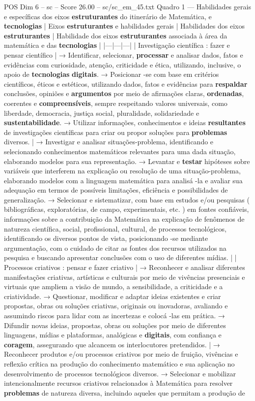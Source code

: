 \begin{textsample}{POS Dim 6 – sc – Score 26.00 – sc/sc\_em\_45.txt}
Quadro 1 — Habilidades gerais e específicas dos eixos \textbf{estruturantes} do itinerário de Matemática, e \textbf{tecnologias} | Eixos \textbf{estruturantes} e habilidades gerais | Habilidades dos eixos \textbf{estruturantes} | Habilidade dos eixos \textbf{estruturantes} associada à área da matemática e das \textbf{tecnologias} | |---|---|---| | Investigação científica : fazer e pensar científico | → Identificar, selecionar, \textbf{processar} e analisar dados, fatos e evidências com curiosidade, atenção, criticidade e ética, utilizando, inclusive, o apoio de \textbf{tecnologias} \textbf{digitais}. → Posicionar -se com base em critérios científicos, éticos e estéticos, utilizando dados, fatos e evidências para \textbf{respaldar} conclusões, opiniões e \textbf{argumentos} por meio de afirmações claras, \textbf{ordenadas}, coerentes e \textbf{compreensíveis}, sempre respeitando valores universais, como liberdade, democracia, justiça social, pluralidade, solidariedade e \textbf{sustentabilidade}. → Utilizar informações, conhecimentos e ideias \textbf{resultantes} de investigações científicas para criar ou propor soluções para \textbf{problemas} diversos. | → Investigar e analisar situações-problema, identificando e selecionando conhecimentos matemáticos relevantes para uma dada situação, elaborando modelos para sua representação. → Levantar e \textbf{testar} hipóteses sobre variáveis que interferem na explicação ou resolução de uma situação-problema, elaborando modelos com a linguagem matemática para analisá -la e avaliar sua adequação em termos de possíveis limitações, eficiência e possibilidades de generalização. → Selecionar e sistematizar, com base em estudos e/ou pesquisas ( bibliográficas, exploratórias, de campo, experimentais, etc. ) em fontes confiáveis, informações sobre a contribuição da Matemática na explicação de fenômenos de natureza científica, social, profissional, cultural, de processos tecnológicos, identificando os diversos pontos de vista, posicionando -se mediante argumentação, com o cuidado de citar as fontes dos recursos utilizados na pesquisa e buscando apresentar conclusões com o uso de diferentes mídias. | | Processos criativos : pensar e fazer criativo | → Reconhecer e analisar diferentes manifestações criativas, artísticas e culturais por meio de vivências presenciais e virtuais que ampliem a visão de mundo, a sensibilidade, a criticidade e a criatividade. → Questionar, modificar e adaptar ideias existentes e criar propostas, obras ou soluções criativas, originais ou inovadoras, avaliando e assumindo riscos para lidar com as incertezas e colocá -las em prática. → Difundir novas ideias, propostas, obras ou soluções por meio de diferentes linguagens, mídias e plataformas, analógicas e \textbf{digitais}, com confiança e \textbf{coragem}, assegurando que alcancem os interlocutores pretendidos. | → Reconhecer produtos e/ou processos criativos por meio de fruição, vivências e reflexão crítica na produção do conhecimento matemático e sua aplicação no desenvolvimento de processos tecnológicos diversos. → Selecionar e mobilizar intencionalmente recursos criativos relacionados à Matemática para resolver \textbf{problemas} de natureza diversa, incluindo aqueles que permitam a produção de 
\end{textsample}
